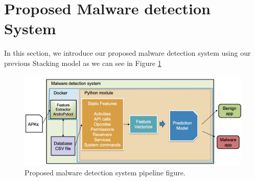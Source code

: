 \section{Proposed Malware detection System}
In this section, we introduce our proposed malware detection system using our previous Stacking model as we can see in Figure \ref{fig:systempipeline}

\begin{figure}[htbp]
    \centering
    \includegraphics[width=\textwidth]{./Figure/systempipeline.png}
    \caption{Proposed malware detection system pipeline figure.}
    \label{fig:systempipeline}
\end{figure}
